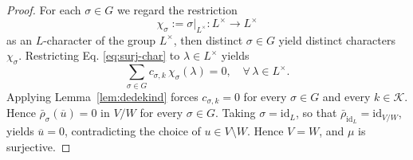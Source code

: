 \documentclass[10pt,a4paper]{amsart}
\begin{document}
\begin{proof}
For each $\sigma\in G$ we regard the
restriction
\[
\chi_{\sigma}:=\sigma|_{L^{\times}}\colon L^{\times}\longrightarrow L^{\times}
\]
as an $L$-character of the group $L^{\times}$, then distinct $\sigma\in G$ yield distinct characters
$\chi_{\sigma}$. Restricting Eq. \eqref{eq:surj-char} to
$\lambda\in L^{\times}$ yields
\[
\sum_{\sigma\in G}c_{\sigma,k}\,\chi_{\sigma}(\lambda)=0,
\quad \forall\,\lambda\in L^{\times}.
\]
 Applying
Lemma~\ref{lem:dedekind} forces $c_{\sigma,k}=0$ for every
$\sigma\in G$ and every $k\in\mathcal K$. Hence
$\bar\rho_{\sigma}(\overline{u})=0$ in $V/W$ for every $\sigma\in G$. Taking $\sigma=\mathrm{id}_{L}$, so that
$\bar\rho_{\mathrm{id}_{L}}=\mathrm{id}_{V/W}$, yields
$\overline{u}=0$, contradicting the choice of $u\in V\setminus W$.
Hence $V=W$, and $\mu$ is surjective.
	

\end{proof}
\end{document}
